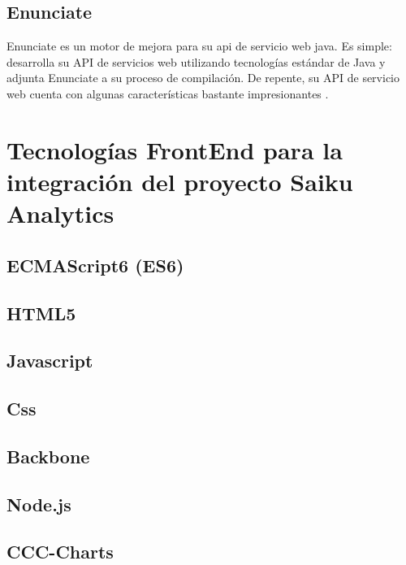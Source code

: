 \begin{spacing}{1.5}
	\subsection{Enunciate}
		Enunciate es un motor de mejora para su api de servicio web java.
		Es simple: desarrolla su API de servicios web utilizando tecnologías estándar de Java y adjunta Enunciate a su proceso de compilación. De repente, su API de servicio web cuenta con algunas características bastante impresionantes \cite{chap2_enunciate}.

\section{Tecnolog\'{i}as FrontEnd para la integraci\'{o}n
		 del proyecto Saiku Analytics}
		\lipsum[1-2]
	\subsection{ECMAScript6 (ES6)}
			\lipsum[1-2]
	\subsection{HTML5}
			\lipsum[1-2]
	\subsection{Javascript}
			\lipsum[1-2]
	\subsection{Css}
			\lipsum[1-2]
	\subsection{Backbone}
			\lipsum[1-2]
	\subsection{Node.js}
			\lipsum[1-2]
	\subsection{CCC-Charts}
			\lipsum[1-2]
\end{spacing}
		
		
		
